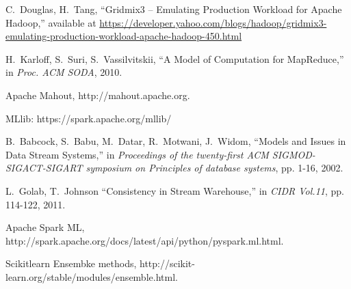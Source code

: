 \documentclass[10pt, conference, letterpaper]{IEEEtran}
\begin{document}
\begin{thebibliography}{99}
C.~Douglas, H.~Tang, ``Gridmix3 -- Emulating Production Workload for Apache Hadoop,'' available at \url{https://developer.yahoo.com/blogs/hadoop/gridmix3-emulating-production-workload-apache-hadoop-450.html}

H.~Karloff, S.~Suri, S.~Vassilvitskii, ``A Model of Computation for MapReduce,'' in \emph{Proc. ACM SODA}, 2010.

Apache Mahout, http://mahout.apache.org.

MLlib: https://spark.apache.org/mllib/

B.~Babcock, S.~Babu, M.~Datar, R.~Motwani, J.~Widom, ``Models and Issues in Data Stream Systems,'' in \emph{Proceedings of the twenty-first ACM SIGMOD-SIGACT-SIGART symposium on Principles of database systems}, pp. 1-16, 2002.

L.~Golab, T.~Johnson ``Consistency in Stream Warehouse,'' in \emph{CIDR Vol.11}, pp. 114-122, 2011.

Apache Spark ML, http://spark.apache.org/docs/latest/api/python/pyspark.ml.html.

Scikitlearn Ensembke methods, http://scikit-learn.org/stable/modules/ensemble.html.


\end{thebibliography}
\end{document}
